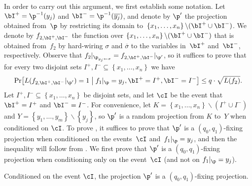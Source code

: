 In order to carry out this argument, we first establish some notation.
Let $\bI^{+}=\p^{-1}(y_{j})$ and $\bI^{-}=\p^{-1}(\overline{y_{j}})$,
and denote by $\p'$ the projection obtained from~$\p$ by restricting
its domain to~$\left\{ x_{1},\ldots,x_{n}\right\} \backslash(\bI^{+}\cup\bI^{-})$.
We denote by $f_{2,\bI^{+},\bI^{-}}$ the function over $\left\{ x_{1},\ldots,x_{n}\right\} \backslash(\bI^{+}\cup\bI^{-})$
that is obtained from~$f_{2}$ by hard-wiring $\sigma$ and $\overline{\sigma}$
to the variables in~$\bI^{+}$ and~$\bI^{-}$, respectively. Observe
that $f_{2}|_{\p_{y_{j}\gets\sigma}}=f_{2,\bI^{+},\bI^{-}}|_{\p'}$,
so it suffices to prove that for every two disjoint sets $I^{+},I^{-}\subseteq\left\{ x_{1},\ldots,x_{n}\right\} $
we have 
\begin{equation}
\Pr\!\left[L(f_{2,\bI^{+},\bI^{-}}|_{\p'})=1\;\middle|\;f_{1}|_{\p}=y_{j},\bI^{+}=I^{+},\bI^{-}=I^{-}\right]\le q\cdot\sqrt{L(f_{2})}.\label{eq:shrinkage-to-two-literals-conditioned-on-I}
\end{equation}
Let $I^{+},I^{-}\subseteq\left\{ x_{1},\ldots,x_{n}\right\} $ be
disjoint sets, and let $\cI$ be the event that $\bI^{+}=I^{+}$ and
$\bI^{-}=I^{-}$. For convenience, let $K=\left\{ x_{1},\ldots,x_{n}\right\} \backslash(I^{+}\cup I^{-})$
and $Y=\left\{ y_{1},\ldots,y_{m}\right\} \backslash\left\{ y_{j}\right\} $,
so $\p'$ is a random projection from $K$ to~$Y$ when conditioned
on $\cI$. To prove ,
it suffices to prove that $\p'$ is a $(q_{0},q_{1})$-fixing projection
when conditioned on the events~$\cI$ and~$f_{1}|_{\p}=y_{j}$,
and then the inequality will follow from .
We first prove that $\p'$ is a $(q_{0},q_{1})$-fixing projection
when conditioning only on the event~$\cI$ (and not on $f_{1}|_{\p}=y_{j}$). 
\begin{proposition}
Conditioned on the event $\cI$, the projection $\p'$ is a $(q_{0},q_{1})$-fixing
projection. 
\end{proposition}

